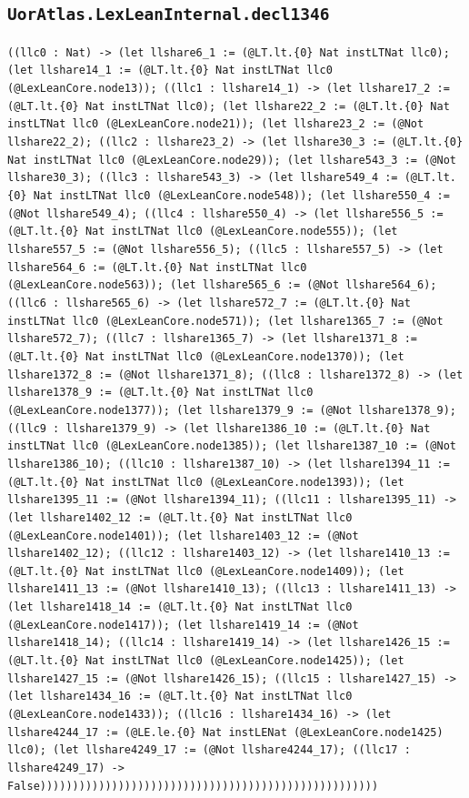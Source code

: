 \documentclass[11pt]{article}
\begin{document}
\subsection*{\texttt{UorAtlas.LexLeanInternal.decl1346}}
\noindent\texttt{((llc0 : Nat) -> (let llshare6\_1 := (@LT.lt.\{0\} Nat instLTNat llc0); (let llshare14\_1 := (@LT.lt.\{0\} Nat instLTNat llc0 (@LexLeanCore.node13)); ((llc1 : llshare14\_1) -> (let llshare17\_2 := (@LT.lt.\{0\} Nat instLTNat llc0); (let llshare22\_2 := (@LT.lt.\{0\} Nat instLTNat llc0 (@LexLeanCore.node21)); (let llshare23\_2 := (@Not llshare22\_2); ((llc2 : llshare23\_2) -> (let llshare30\_3 := (@LT.lt.\{0\} Nat instLTNat llc0 (@LexLeanCore.node29)); (let llshare543\_3 := (@Not llshare30\_3); ((llc3 : llshare543\_3) -> (let llshare549\_4 := (@LT.lt.\{0\} Nat instLTNat llc0 (@LexLeanCore.node548)); (let llshare550\_4 := (@Not llshare549\_4); ((llc4 : llshare550\_4) -> (let llshare556\_5 := (@LT.lt.\{0\} Nat instLTNat llc0 (@LexLeanCore.node555)); (let llshare557\_5 := (@Not llshare556\_5); ((llc5 : llshare557\_5) -> (let llshare564\_6 := (@LT.lt.\{0\} Nat instLTNat llc0 (@LexLeanCore.node563)); (let llshare565\_6 := (@Not llshare564\_6); ((llc6 : llshare565\_6) -> (let llshare572\_7 := (@LT.lt.\{0\} Nat instLTNat llc0 (@LexLeanCore.node571)); (let llshare1365\_7 := (@Not llshare572\_7); ((llc7 : llshare1365\_7) -> (let llshare1371\_8 := (@LT.lt.\{0\} Nat instLTNat llc0 (@LexLeanCore.node1370)); (let llshare1372\_8 := (@Not llshare1371\_8); ((llc8 : llshare1372\_8) -> (let llshare1378\_9 := (@LT.lt.\{0\} Nat instLTNat llc0 (@LexLeanCore.node1377)); (let llshare1379\_9 := (@Not llshare1378\_9); ((llc9 : llshare1379\_9) -> (let llshare1386\_10 := (@LT.lt.\{0\} Nat instLTNat llc0 (@LexLeanCore.node1385)); (let llshare1387\_10 := (@Not llshare1386\_10); ((llc10 : llshare1387\_10) -> (let llshare1394\_11 := (@LT.lt.\{0\} Nat instLTNat llc0 (@LexLeanCore.node1393)); (let llshare1395\_11 := (@Not llshare1394\_11); ((llc11 : llshare1395\_11) -> (let llshare1402\_12 := (@LT.lt.\{0\} Nat instLTNat llc0 (@LexLeanCore.node1401)); (let llshare1403\_12 := (@Not llshare1402\_12); ((llc12 : llshare1403\_12) -> (let llshare1410\_13 := (@LT.lt.\{0\} Nat instLTNat llc0 (@LexLeanCore.node1409)); (let llshare1411\_13 := (@Not llshare1410\_13); ((llc13 : llshare1411\_13) -> (let llshare1418\_14 := (@LT.lt.\{0\} Nat instLTNat llc0 (@LexLeanCore.node1417)); (let llshare1419\_14 := (@Not llshare1418\_14); ((llc14 : llshare1419\_14) -> (let llshare1426\_15 := (@LT.lt.\{0\} Nat instLTNat llc0 (@LexLeanCore.node1425)); (let llshare1427\_15 := (@Not llshare1426\_15); ((llc15 : llshare1427\_15) -> (let llshare1434\_16 := (@LT.lt.\{0\} Nat instLTNat llc0 (@LexLeanCore.node1433)); ((llc16 : llshare1434\_16) -> (let llshare4244\_17 := (@LE.le.\{0\} Nat instLENat (@LexLeanCore.node1425) llc0); (let llshare4249\_17 := (@Not llshare4244\_17); ((llc17 : llshare4249\_17) -> False))))))))))))))))))))))))))))))))))))))))))))))))))))}\par
\end{document}

